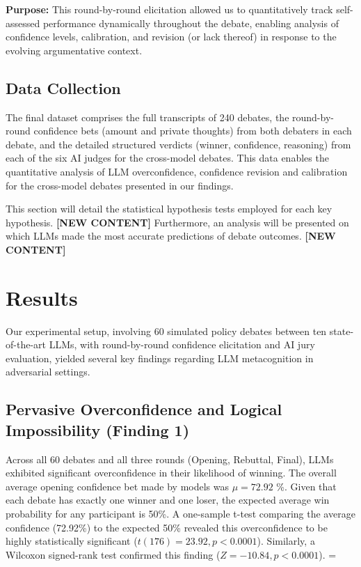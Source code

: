\documentclass{article}
\begin{document}
\textbf{Purpose:} This round-by-round elicitation allowed us to quantitatively track self-assessed performance dynamically throughout the debate, enabling analysis of confidence levels, calibration, and revision (or lack thereof) in response to the evolving argumentative context.


\subsection{Data Collection}
\label{subsec:data_collection}
The final dataset comprises the full transcripts of 240 debates, the round-by-round confidence bets (amount and private thoughts) from both debaters in each debate, and the detailed structured verdicts (winner, confidence, reasoning) from each of the six AI judges for the cross-model debates. This data enables the quantitative analysis of LLM overconfidence, confidence revision and calibration for the cross-model debates presented in our findings.

This section will detail the statistical hypothesis tests employed for each key hypothesis. \textbf{[NEW CONTENT]}
Furthermore, an analysis will be presented on which LLMs made the most accurate predictions of debate outcomes. \textbf{[NEW CONTENT]}

\section{Results}
\label{sec:results}

\lstset{style=promptstyle} %

Our experimental setup, involving 60 simulated policy debates between ten state-of-the-art LLMs, with round-by-round confidence elicitation and AI jury evaluation, yielded several key findings regarding LLM metacognition in adversarial settings.

\subsection{Pervasive Overconfidence and Logical Impossibility (Finding 1)}

Across all 60 debates and all three rounds (Opening, Rebuttal, Final), LLMs exhibited significant overconfidence in their likelihood of winning. The overall average opening confidence bet made by models was $\mu = 72.92$ \%. Given that each debate has exactly one winner and one loser, the expected average win probability for any participant is 50\%. A one-sample t-test comparing the average confidence (72.92\%) to the expected 50\% revealed this overconfidence to be highly statistically significant ($t(176) = 23.92, p < 0.0001$). Similarly, a Wilcoxon signed-rank test confirmed this finding ($Z= -10.84, p < 0.0001$). =
\end{document}
